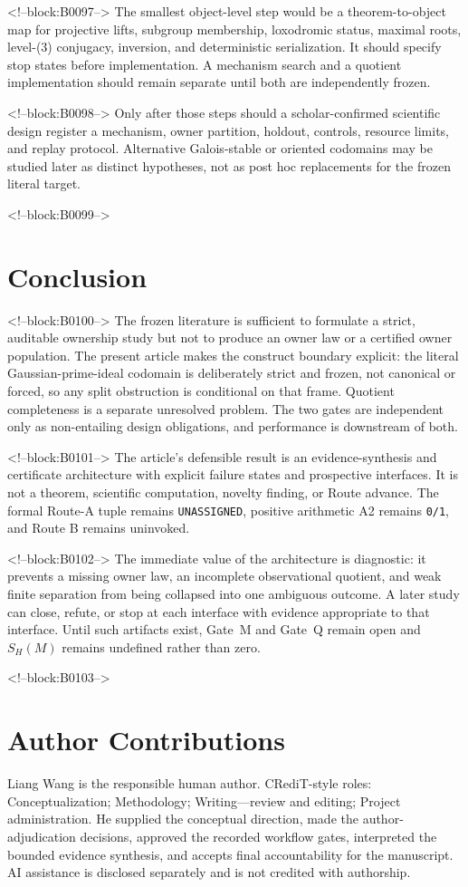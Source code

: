 \documentclass[11pt,a4paper]{article}
\begin{document}
<!--block:B0097-->
The smallest object-level step would be a theorem-to-object map for projective lifts, subgroup membership, loxodromic status, maximal roots, level-(3) conjugacy, inversion, and deterministic serialization. It should specify stop states before implementation. A mechanism search and a quotient implementation should remain separate until both are independently frozen.

<!--block:B0098-->
Only after those steps should a scholar-confirmed scientific design register a mechanism, owner partition, holdout, controls, resource limits, and replay protocol. Alternative Galois-stable or oriented codomains may be studied later as distinct hypotheses, not as post hoc replacements for the frozen literal target.

<!--block:B0099-->
\section{Conclusion}

<!--block:B0100-->
The frozen literature is sufficient to formulate a strict, auditable ownership study but not to produce an owner law or a certified owner population. The present article makes the construct boundary explicit: the literal Gaussian-prime-ideal codomain is deliberately strict and frozen, not canonical or forced, so any split obstruction is conditional on that frame. Quotient completeness is a separate unresolved problem. The two gates are independent only as non-entailing design obligations, and performance is downstream of both.

<!--block:B0101-->
The article's defensible result is an evidence-synthesis and certificate architecture with explicit failure states and prospective interfaces. It is not a theorem, scientific computation, novelty finding, or Route advance. The formal Route-A tuple remains \texttt{UNASSIGNED}, positive arithmetic A2 remains \texttt{0/1}, and Route B remains uninvoked.

<!--block:B0102-->
The immediate value of the architecture is diagnostic: it prevents a missing owner law, an incomplete observational quotient, and weak finite separation from being collapsed into one ambiguous outcome. A later study can close, refute, or stop at each interface with evidence appropriate to that interface. Until such artifacts exist, Gate~M and Gate~Q remain open and \(S_H(M)\) remains undefined rather than zero.

<!--block:B0103-->
\section*{Author Contributions}
Liang Wang is the responsible human author. CRediT-style roles: Conceptualization; Methodology; Writing---review and editing; Project administration. He supplied the conceptual direction, made the author-adjudication decisions, approved the recorded workflow gates, interpreted the bounded evidence synthesis, and accepts final accountability for the manuscript. AI assistance is disclosed separately and is not credited with authorship.
\end{document}

